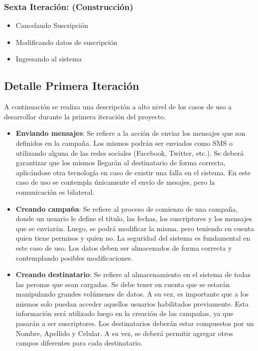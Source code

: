\documentclass[a4paper, 11pt]{article}
\begin{document}
\subsubsection{Sexta Iteraci\'on: (Construcci\'on)}
\begin{itemize}
\item Cancelando Suscripción
\item Modificando datos de suscripción
\item Ingresando al sistema
\end{itemize}

\subsection{Detalle Primera Iteración}
A continuación se realiza una descripción a alto nivel de los casos de uso a desarrollar durante la primera iteración del proyecto. 
\begin{itemize}
\item \textbf{Enviando mensajes}: Se refiere a la acción de enviar los mensajes que son definidos en la campaña. Los mismos podrán ser enviados como SMS o utilizando alguna de las redes sociales (Facebook, Twitter, etc.). Se deberá garantizar que los mismos llegarán al destinatario de forma correcta, aplicándose otra tecnología en caso de existir una falla en el sistema. En este caso de uso se contempla únicamente el envío de mesajes, pero la comunicación es bilateral. 
\item \textbf{Creando campaña}: Se refiere al proceso de comienzo de una campaña, donde un usuario le define el título, las fechas, los suscriptores y los mensajes que se enviarán. Luego, se podrá modificar la misma, pero teniendo en cuenta quien tiene permisos y quien no. La seguridad del sistema es fundamental en este caso de uso. Los datos deben ser almacenados de forma correcta y contemplando posibles modificaciones. 
\item \textbf{Creando destinatario}: Se refiere al almacenamiento en el sistema de todas las peronas que sean cargadas. Se debe tener en cuenta que se estarán manipulando grandes volúmenes de datos. A su vez, es importante que a los mismos solo puedan acceder aquellos usuarios habilitados previamente. Esta información será utilizado luego en la creación de las campañas, ya que pasarán a ser suscriptores. Los destinatarios deberán estar compuestos por un Nombre, Apellido y Celular. A su vez, se deberá permitir agregar otros campos diferentes para cada destinatario. 
\end{itemize}
\end{document}
